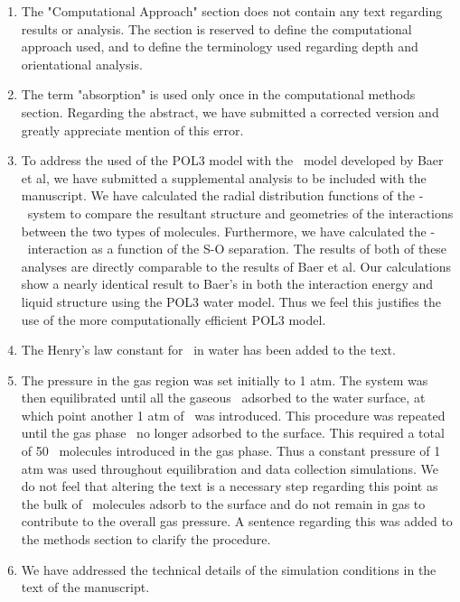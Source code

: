 \documentclass{article}
\begin{document}
\begin{enumerate}
\item The "Computational Approach" section does not contain any text regarding results or analysis. The section is reserved to define the computational approach used, and to define the terminology used regarding depth and orientational analysis.

\item The term "absorption" is used only once in the computational methods section. Regarding the abstract, we have submitted a corrected version and greatly appreciate mention of this error.

\item To address the used of the POL3 model with the \suldiox~model developed by Baer et al, we have submitted a supplemental analysis to be included with the manuscript. We have calculated the radial distribution functions of the \wat-\suldiox~system to compare the resultant structure and geometries of the interactions between the two types of molecules. Furthermore, we have calculated the \suldiox-\wat~interaction as a function of the S-O separation. The results of both of these analyses are directly comparable to the results of Baer et al. Our calculations show a nearly identical result to Baer's in both the interaction energy and liquid structure using the POL3 water model. Thus we feel this justifies the use of the more computationally efficient POL3 model.

\item The Henry's law constant for \suldiox~in water has been added to the text.

\item The pressure in the gas region was set initially to 1 atm. The system was then equilibrated until all the gaseous \suldiox~adsorbed to the water surface, at which point another 1 atm of \suldiox~was introduced. This procedure was repeated until the gas phase \suldiox~no longer adsorbed to the surface. This required a total of 50 \suldiox~molecules introduced in the gas phase. Thus a constant pressure of 1 atm was used throughout equilibration and data collection simulations. We do not feel that altering the text is a necessary step regarding this point as the bulk of \suldiox~molecules adsorb to the surface and do not remain in gas to contribute to the overall gas pressure. A sentence regarding this was added to the methods section to clarify the procedure.

\item We have addressed the technical details of the simulation conditions in the text of the manuscript.


\end{enumerate}
\end{document}
